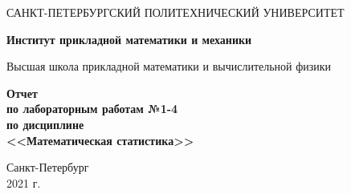 \begin{titlepage}
   \begin{center}
       \vspace*{3cm}
       \large{САНКТ-ПЕТЕРБУРГСКИЙ ПОЛИТЕХНИЧЕСКИЙ УНИВЕРСИТЕТ}
       \vspace{0.4 cm}
       
       \large\textbf{Институт прикладной математики и механики}
       \vspace{0.4 cm}
       
       \large{Высшая школа прикладной математики и вычислительной физики}
       
       \vspace{3 cm}
       \normalsize\textbf{Отчет\\ по лабораторным работам №1-4 \\ по дисциплине \\ <<Математическая статистика>>}
       \vfill
            
       \vspace{0.8cm}
     
            
       \normalsize{Санкт-Петербург\\2021 г.}
            
   \end{center}
\end{titlepage}